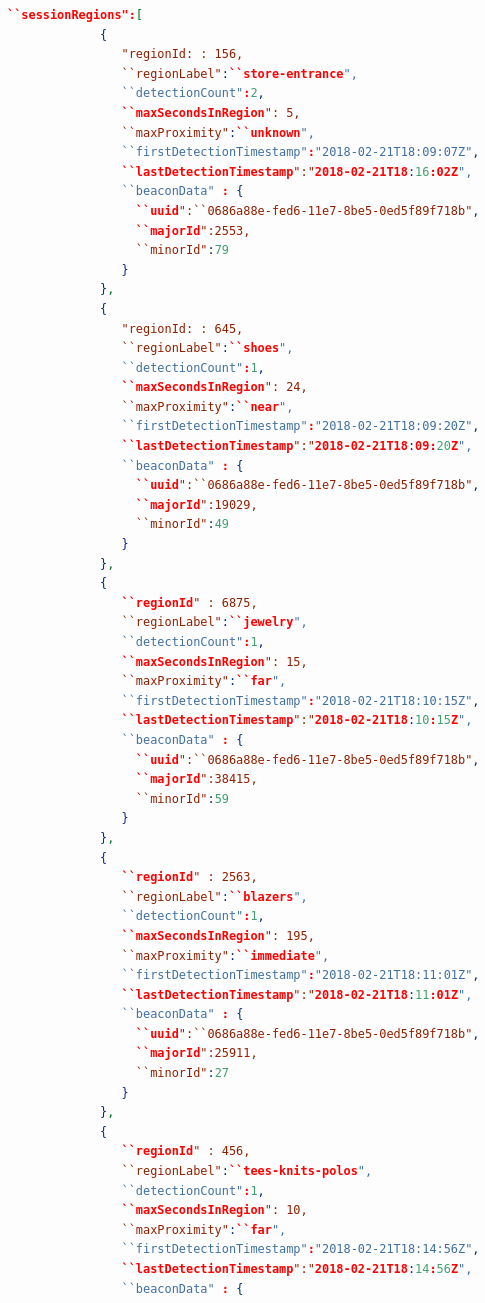 \begin{lstlisting}[language=json,firstnumber=1]
       ``sessionRegions":[
             {
                "regionId: : 156,
                ``regionLabel":``store-entrance",
                ``detectionCount":2,
                ``maxSecondsInRegion": 5,
                ``maxProximity":``unknown",
                ``firstDetectionTimestamp":"2018-02-21T18:09:07Z",
                ``lastDetectionTimestamp":"2018-02-21T18:16:02Z",
                ``beaconData" : {
                  ``uuid":``0686a88e-fed6-11e7-8be5-0ed5f89f718b",
                  ``majorId":2553,
                  ``minorId":79
                }
             },
             {
                "regionId: : 645,
                ``regionLabel":``shoes",
                ``detectionCount":1,
                ``maxSecondsInRegion": 24,
                ``maxProximity":``near",
                ``firstDetectionTimestamp":"2018-02-21T18:09:20Z",
                ``lastDetectionTimestamp":"2018-02-21T18:09:20Z",
                ``beaconData" : {
                  ``uuid":``0686a88e-fed6-11e7-8be5-0ed5f89f718b",
                  ``majorId":19029,
                  ``minorId":49
                }
             },
             {
                ``regionId" : 6875,
                ``regionLabel":``jewelry",
                ``detectionCount":1,
                ``maxSecondsInRegion": 15,
                ``maxProximity":``far",
                ``firstDetectionTimestamp":"2018-02-21T18:10:15Z",
                ``lastDetectionTimestamp":"2018-02-21T18:10:15Z",
                ``beaconData" : {
                  ``uuid":``0686a88e-fed6-11e7-8be5-0ed5f89f718b",
                  ``majorId":38415,
                  ``minorId":59
                }
             },
             {
                ``regionId" : 2563,
                ``regionLabel":``blazers",
                ``detectionCount":1,
                ``maxSecondsInRegion": 195,
                ``maxProximity":``immediate",
                ``firstDetectionTimestamp":"2018-02-21T18:11:01Z",
                ``lastDetectionTimestamp":"2018-02-21T18:11:01Z",
                ``beaconData" : {
                  ``uuid":``0686a88e-fed6-11e7-8be5-0ed5f89f718b",
                  ``majorId":25911,
                  ``minorId":27
                }
             },
             {
                ``regionId" : 456,
                ``regionLabel":``tees-knits-polos",
                ``detectionCount":1,
                ``maxSecondsInRegion": 10,
                ``maxProximity":``far",
                ``firstDetectionTimestamp":"2018-02-21T18:14:56Z",
                ``lastDetectionTimestamp":"2018-02-21T18:14:56Z",
                ``beaconData" : {

\end{lstlisting}
